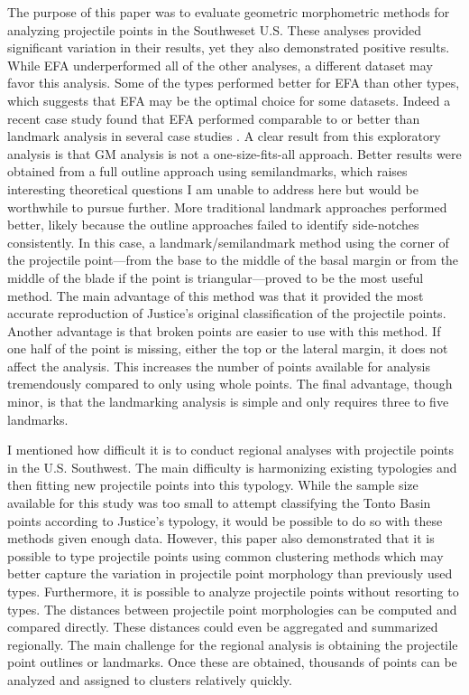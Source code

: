\documentclass[letterpaper]{article}
\begin{document}
The purpose of this paper was to evaluate geometric morphometric methods for analyzing projectile points in the Southweset U.S. These analyses provided significant variation in their results, yet they also demonstrated positive results. While EFA underperformed all of the other analyses, a different dataset may favor this analysis. Some of the types performed better for EFA than other types, which suggests that EFA may be the optimal choice for some datasets. Indeed a recent case study found that EFA performed comparable to or better than landmark analysis in several case studies \autocite{Matzig2021-id}. A clear result from this exploratory analysis is that GM analysis is not a one-size-fits-all approach. Better results were obtained from a full outline approach using semilandmarks, which raises interesting theoretical questions I am unable to address here but would be worthwhile to pursue further. More traditional landmark approaches performed better, likely because the outline approaches failed to identify side-notches consistently. In this case, a landmark/semilandmark method using the corner of the projectile point---from the base to the middle of the basal margin or from the middle of the blade if the point is triangular---proved to be the most useful method. The main advantage of this method was that it provided the most accurate reproduction of Justice's original classification of the projectile points. Another advantage is that broken points are easier to use with this method. If one half of the point is missing, either the top or the lateral margin, it does not affect the analysis. This increases the number of points available for analysis tremendously compared to only using whole points. The final advantage, though minor, is that the landmarking analysis is simple and only requires three to five landmarks.

I mentioned how difficult it is to conduct regional analyses with projectile points in the U.S. Southwest. The main difficulty is harmonizing existing typologies and then fitting new projectile points into this typology. While the sample size available for this study was too small to attempt classifying the Tonto Basin points according to Justice's typology, it would be possible to do so with these methods given enough data. However, this paper also demonstrated that it is possible to type projectile points using common clustering methods which may better capture the variation in projectile point morphology than previously used types. Furthermore, it is possible to analyze projectile points without resorting to types. The distances between projectile point morphologies can be computed and compared directly. These distances could even be aggregated and summarized regionally. The main challenge for the regional analysis is obtaining the projectile point outlines or landmarks. Once these are obtained, thousands of points can be analyzed and assigned to clusters relatively quickly.
\end{document}
